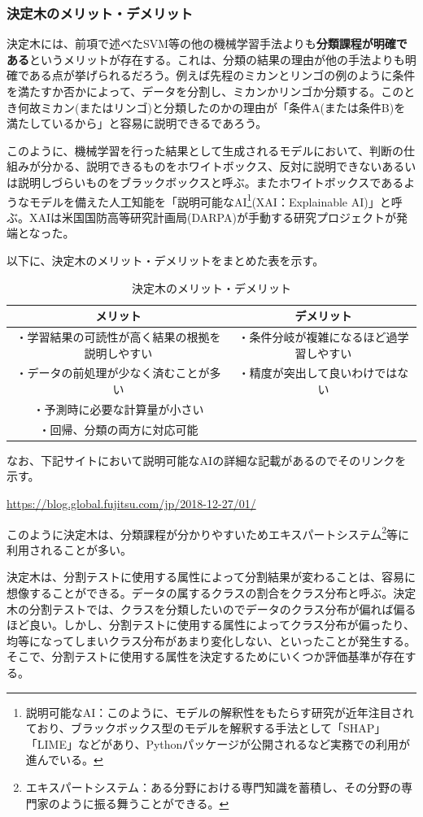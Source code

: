 \documentclass[dvipdfmx]{jsarticle}
\begin{document}
\subsubsection{決定木のメリット・デメリット}
決定木には、前項で述べたSVM等の他の機械学習手法よりも\textbf{分類課程が明確である}というメリットが存在する。これは、分類の結果の理由が他の手法よりも明確である点が挙げられるだろう。例えば先程のミカンとリンゴの例のように条件を満たすか否かによって、データを分割し、ミカンかリンゴか分類する。このとき何故ミカン(またはリンゴ)と分類したのかの理由が「条件A(または条件B)を満たしているから」と容易に説明できるであろう。\par
このように、機械学習を行った結果として生成されるモデルにおいて、判断の仕組みが分かる、説明できるものをホワイトボックス、反対に説明できないあるいは説明しづらいものをブラックボックスと呼ぶ。またホワイトボックスであるようなモデルを備えた人工知能を「説明可能なAI\footnote{説明可能なAI：このように、モデルの解釈性をもたらす研究が近年注目されており、ブラックボックス型のモデルを解釈する手法として「SHAP」「LIME」などがあり、Pythonパッケージが公開されるなど実務での利用が進んでいる。}(XAI：Explainable AI)」と呼ぶ。XAIは米国国防高等研究計画局(DARPA)が手動する研究プロジェクトが発端となった。\par
以下に、決定木のメリット・デメリットをまとめた表を示す。
\begin{table}[H]
  \begin{center}
    \caption{決定木のメリット・デメリット}
    \begin{tabular}{|c|c|} \hline
      メリット & デメリット \\ \hline
      ・学習結果の可読性が高く結果の根拠を説明しやすい & ・条件分岐が複雑になるほど過学習しやすい\\
      ・データの前処理が少なく済むことが多い & ・精度が突出して良いわけではない\\
      ・予測時に必要な計算量が小さい & \\
      ・回帰、分類の両方に対応可能 &　\\ \hline
    \end{tabular}
    \label{hyo01}
  \end{center}
\end{table}
なお、下記サイトにおいて説明可能なAIの詳細な記載があるのでそのリンクを示す。\par
\url{https://blog.global.fujitsu.com/jp/2018-12-27/01/} \par
このように決定木は、分類課程が分かりやすいためエキスパートシステム\footnote{エキスパートシステム：ある分野における専門知識を蓄積し、その分野の専門家のように振る舞うことができる。}等に利用されることが多い。\par
決定木は、分割テストに使用する属性によって分割結果が変わることは、容易に想像することができる。データの属するクラスの割合をクラス分布と呼ぶ。決定木の分割テストでは、クラスを分類したいのでデータのクラス分布が偏れば偏るほど良い。しかし、分割テストに使用する属性によってクラス分布が偏ったり、均等になってしまいクラス分布があまり変化しない、といったことが発生する。そこで、分割テストに使用する属性を決定するためにいくつか評価基準が存在する。
\end{document}
